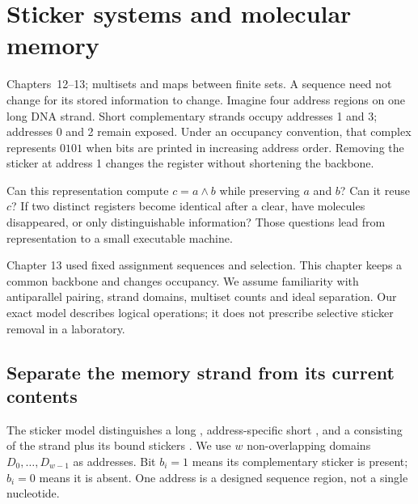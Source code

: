 \chapter{Sticker systems and molecular memory}
{Chapters~12--13; multisets and maps between finite sets.}
A sequence need not change for its stored information to change. Imagine
four address regions on one long DNA strand. Short complementary strands
occupy addresses 1 and 3; addresses 0 and 2 remain exposed. Under an
occupancy convention, that complex represents $0101$ when bits are printed
in increasing address order. Removing the sticker at address 1 changes the
register without shortening the backbone.

Can this representation compute $c=a\land b$ while preserving $a$ and $b$?
Can it reuse $c$? If two distinct registers become identical after a clear,
have molecules disappeared, or only distinguishable information?
Those questions lead from representation to a small executable machine.

Chapter 13 used fixed assignment sequences and selection. This chapter
keeps a common backbone and changes occupancy. We assume familiarity with
antiparallel pairing, strand domains, multiset counts and ideal separation.
Our exact model describes logical operations; it does not prescribe
selective sticker removal in a laboratory.

\section{Separate the memory strand from its current contents}
The sticker model distinguishes a long , address-specific
short , and a  consisting of the strand
plus its bound stickers \cite{Roweis1998}. We use $w$ non-overlapping domains
$D_0,\ldots,D_{w-1}$ as addresses. Bit $b_i=1$ means its complementary
sticker is present; $b_i=0$ means it is absent. One address is a designed
sequence region, not a single nucleotide.

